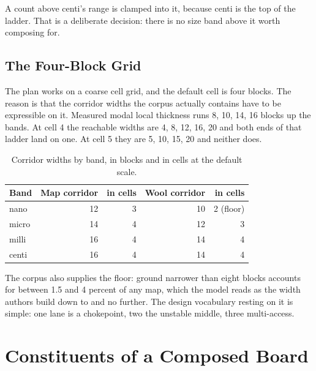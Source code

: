 A count above centi's range is clamped into it, because centi is the top of the
ladder. That is a deliberate decision: there is no size band above it worth
composing for.

\subsection{The Four-Block Grid}

The plan works on a coarse cell grid, and the default cell is four blocks. The
reason is that the corridor widths the corpus actually contains have to be
expressible on it. Measured modal local thickness runs 8, 10, 14, 16 blocks up the
bands. At cell 4 the reachable widths are 4, 8, 12, 16, 20 and both ends of that
ladder land on one. At cell 5 they are 5, 10, 15, 20 and neither does.

\begin{table}[htbp]
\caption{Corridor widths by band, in blocks and in cells at the default scale.}
\label{tab:corridors}
\small
\begin{tabular}{l r r r r}
\toprule
\textbf{Band} & \textbf{Map corridor} & \textbf{in cells} &
\textbf{Wool corridor} & \textbf{in cells} \\
\midrule
nano  & 12 & 3 & 10 & 2 (floor) \\
micro & 14 & 4 & 12 & 3 \\
milli & 16 & 4 & 14 & 4 \\
centi & 16 & 4 & 14 & 4 \\
\bottomrule
\end{tabular}
\end{table}

The corpus also supplies the floor: ground narrower than eight blocks accounts for
between 1.5 and 4 percent of any map, which the model reads as the width authors
build down to and no further. The design vocabulary resting on it is simple: one
lane is a chokepoint, two the unstable middle, three multi-access.

\section{Constituents of a Composed Board}

